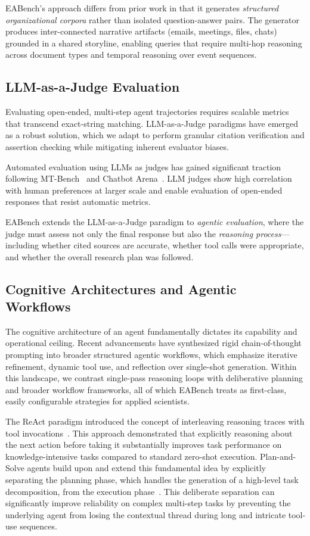\documentclass[journal,dvipsnames]{acmart}
\begin{document}
EABench's approach differs from prior work in that it generates
\emph{structured organizational corpora} rather than isolated question-answer
pairs.  The generator produces inter-connected narrative artifacts (emails,
meetings, files, chats) grounded in a shared storyline, enabling queries that
require multi-hop reasoning across document types and temporal reasoning over
event sequences.

\subsection{LLM-as-a-Judge Evaluation}

Evaluating open-ended, multi-step agent trajectories requires scalable metrics that transcend exact-string matching. LLM-as-a-Judge paradigms have emerged as a robust solution, which we adapt to perform granular citation verification and assertion checking while mitigating inherent evaluator biases.

Automated evaluation using LLMs as judges has gained significant traction following MT-Bench~\cite{zheng2023judging} and Chatbot Arena~\cite{chiang2024chatbot}. LLM judges show high correlation with human
preferences at larger scale and enable evaluation of open-ended responses that
resist automatic metrics.

EABench extends the LLM-as-a-Judge paradigm to \emph{agentic evaluation},
where the judge must assess not only the final response but also the
\emph{reasoning process}---including whether cited sources are accurate,
whether tool calls were appropriate, and whether the overall research plan was
followed.

\subsection{Cognitive Architectures and Agentic Workflows}

The cognitive architecture of an agent fundamentally dictates its capability and operational ceiling. Recent advancements have synthesized rigid chain-of-thought prompting into broader structured agentic workflows, which emphasize iterative refinement, dynamic tool use, and reflection over single-shot generation. Within this landscape, we contrast single-pass reasoning loops with deliberative planning and broader workflow frameworks, all of which EABench treats as first-class, easily configurable strategies for applied scientists.

The ReAct paradigm introduced the concept of interleaving reasoning traces with tool invocations~\cite{yao2022react}. This approach demonstrated that explicitly reasoning about the next action before taking it substantially improves task performance on knowledge-intensive tasks compared to standard zero-shot execution. Plan-and-Solve agents build upon and extend this fundamental idea by explicitly separating the planning phase, which handles the generation of a high-level task decomposition, from the execution phase~\cite{wang2023plansolve}. This deliberate separation can significantly improve reliability on complex multi-step tasks by preventing the underlying agent from losing the contextual thread during long and intricate tool-use sequences.
\end{document}
